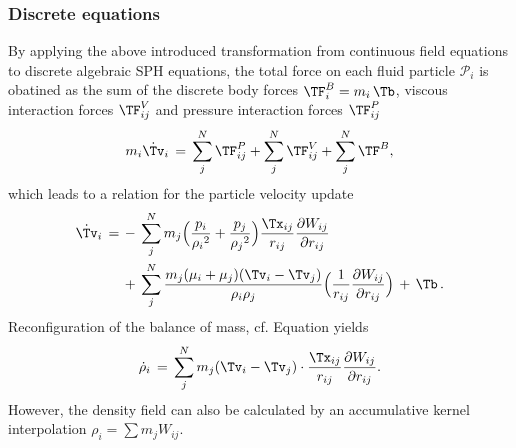 \subsubsection{Discrete equations}

By applying the above introduced transformation from continuous field equations to discrete algebraic SPH equations, the total force on each fluid particle $\mathcal{P}_i$ is obatined as the sum of the discrete body forces $\TF_i^B =  m_i\,\Tb $, viscous interaction forces $\TF_{ij}^V$ and pressure interaction forces $ \TF_{ij}^P$
\begin{equation}
\label{eq:SPH_momentum_balance}
    m_i \dot{\Tv}_i \, = \, \sum_j^N \TF_{ij}^P  + \sum_j^N \TF_{ij}^V + \sum_j^N \TF^B,
\end{equation}
which leads to a relation for the particle velocity update
\begin{align}
    \label{eq:SPH_update_velocity}
    \dot{\Tv}_i \, = \, & - \, \sum_j^N m_j \Big( \frac{p_i}{{\rho_i}^2} + \frac{p_j}{{\rho_j}^2} \Big) \frac{\Tx_{ij}}{r_{ij}} \frac{\partial W_{ij}}{\partial r_{ij}} \, \\ 
    & + \, \sum_j^N \frac{m_j (\mu_i + \mu_j)(\Tv_i - \Tv_j)}{\rho_i \rho_j} \Big( \frac{1}{r_{ij}} \frac{\partial W_{ij}}{\partial r_{ij}} \Big) \, + \, \Tb \, .
\end{align}
Reconfiguration of the balance of mass, cf. Equation  yields 
\begin{equation}
\label{eq:SPH_discrete_mass_balance}
    \dot{\rho}_i \, = \, \sum_j^N m_j (\Tv_i - \Tv_j) \cdot \frac{\Tx_{ij} }{r_{ij}} \frac{\partial W_{ij}}{\partial r_{ij}}.
\end{equation}
However, the density field can also be calculated by an accumulative kernel interpolation $\rho_i = \sum m_j W_{ij}$.
